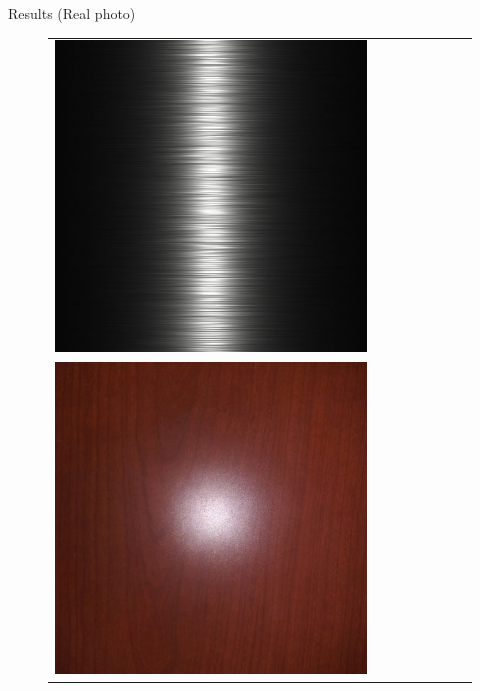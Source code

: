 \documentclass[final]{beamer}
\newlength{\twocolwid}
\newlength{\resultwidth}
\begin{document}
\begin{frame}[t]
\begin{columns}[t]
\begin{column}{\twocolwid}
\begin{block}{Results (Real photo)}
\begin{figure}[t]
\begin{tabular}{ccrclccc}
            		\includegraphics[width=\resultwidth]{images/real/metal/bad1.jpg}
            		\\
            		\includegraphics[width=\resultwidth]{images/real/wood/target.jpg} &

\end{tabular}
\end{figure}
\end{block}
\end{column}
\end{columns}
\end{frame}
\end{document}
